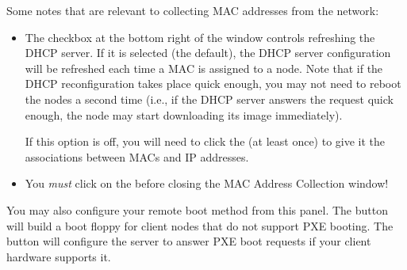 \noindent Some notes that are relevant to collecting MAC addresses from the
network:

\begin{itemize}
\item The  checkbox at the bottom right of
  the window controls refreshing the DHCP server.  If it is selected
  (the default), the DHCP server configuration will be refreshed each
  time a MAC is assigned to a node.  Note that if the DHCP
  reconfiguration takes place quick enough, you may not need to reboot
  the nodes a second time (i.e., if the DHCP server answers the
  request quick enough, the node may start downloading its image
  immediately).
  
  If this option is off, you will need to click the  (at least once) to give it the associations between
  MACs and IP addresses.
  

\item You {\em must} click on the  before
  closing the MAC Address Collection window!
\end{itemize}

You may also configure your remote boot method from this panel. The
 button will build a boot floppy for
client nodes that do not support PXE booting. The  button will configure the server to answer PXE boot
requests if your client hardware supports it. 


